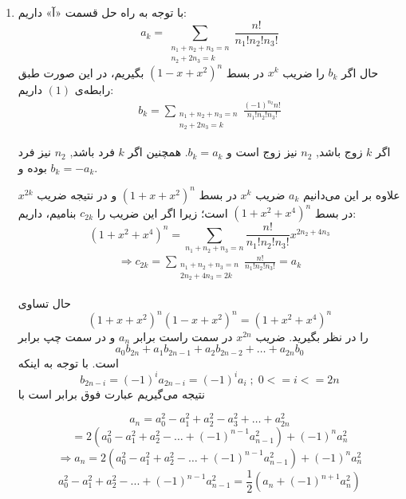 \begin{enumerate}
	\item
        \p
    	با توجه به راه حل قسمت 
        «آ»
        داریم:
        \[
            a_k = \sum_{\substack{n_1 + n_2 + n_3 = n \\ n_2 + 2n_3 = k}} \frac{n!}{n_1!n_2!n_3!}
        \]
    	حال اگر 
        $b_k$
        را ضریب 
        $x^k$
         در بسط 
         $(1 - x + x^2)^n$
        بگیریم، در این صورت 
        طبق رابطه‌ی 
        $(1)$
        داریم:
        \begin{align*}
            b_k = \sum_{\substack{n_1 + n_2 + n_3 =  n\\  n_2 + 2n_3 = k}} \frac{(-1)^{n_2}n!}{n_1!n_2!n_3!}
        \end{align*}

    	اگر 
         $k$
        زوج باشد,
        $n_2$
        نیز زوج است و 
        $b_k = a_k$.
        همچنین اگر 
        $k$
        فرد باشد, $n_2$ نیز فرد بوده و $b_k = -a_k$.
    	 
        \p
         علاوه بر این می‌دانیم 
        $a_k$
        ضریب 
        $x^k$
        در بسط 
        $(1 + x + x^2)^n$
        و در نتیجه ضریب 
        $x^{2k}$
        در بسط 
        $(1 + x^2 + x^4)^n$
          است؛ زیرا اگر این ضریب را
          $c_{2k}$
          بنامیم، داریم: 
        $$(1+x^2+x^4)^n=\sum_{n_1+n_2+n_3=n} \frac{n!}{n_1!n_2!n_3!} x^{2n_2+4n_3}$$
        \begin{align*}
            \Rightarrow c_{2k} = \sum_{\substack{n_1+n_2+n_3=n\\  2n_2 + 4n_3 = 2k}} \frac{n!}{n_1!n_2!n_3!} = a_{k}
        \end{align*}
        
         \p
         حال تساوی
        $$(1 + x + x^2)^n(1 - x + x^2)^n = (1 + x^2 + x^4)^n$$
        را در نظر بگیرید. ضریب
        $x^{2n}$
         در سمت راست برابر 
         $a_n$
          و در سمت چپ برابر
        $$a_0b_{2n} + a_1b_{2n - 1} + a_2b_{2n - 2} + \dots + a_{2n}b_0$$
        است. با توجه به اینکه
        $$b_{2n-i} = (-1)^i a_{2n-i} = (-1)^i a_{i} \; ; \; 0 <= i <= 2n$$
        نتیجه می‌گیریم عبارت فوق برابر است با
        
        $$a_n = a_0^2 - a_1^2 + a_2^2 - a_3^2 + \dots + a_{2n}^2 $$
        $$= 2(a_0^2 - a_1^2 + a_2^2 - \dots + (-1)^{n - 1}a_{n - 1}^2) + (-1)^n a_n^2$$
        $$\Rightarrow a_n = 2(a_0^2 - a_1^2 + a_2^2 - \dots + (-1)^{n - 1}a_{n - 1}^2) + (-1)^n a_n^2 $$
        $$a_0^2 - a_1^2 + a_2^2 - ... + (-1)^{n - 1}a_{n - 1}^2 = \frac{1}{2}(a_n + (-1)^{n + 1}a_n^2)$$
        
	\end{enumerate}
